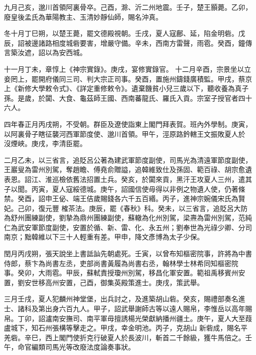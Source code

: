 \begin{pinyinscope}
 九月己亥，邈川首領阿裏骨卒。己酉，滁、沂二州地震。壬子，楚王顥薨。乙卯，廢皇後孟氏為華陽教主、玉清妙靜仙師，賜名沖真。



 冬十月丁巳朔，以楚王薨，罷文德殿視朝。壬戌，夏人寇鄜、延，陷金明砦。戊辰，詔被邊諸路相度城砦要害，增嚴守備。辛未，西南方雷聲，雨雹。癸酉，鐘傳言築汝遮，詔以為安西城。



 十一月丁未，章惇上《神宗實錄》。庚戌，宴修實錄官。
 十二月辛酉，宗景坐以立妾罔上，罷開府儀同三司、判大宗正司事。癸酉，置施州鑄錢廣積監。甲戌，蔡京上《新修大學敕令式》、《詳定重修敕令》。遺棄饑貧小兒三歲以下，聽收養為真子孫。是歲，於闐、大食、龜茲師王國、西南蕃龍氏、羅氏入貢。宗室子授官者四十六人。



 四年春正月丙戌朔，不受朝。群臣及遼使詣東上閣門拜表賀。班內外學制。庚寅，以阿裏骨子瞎征襲河西軍節度使、邈川首領。甲午，涇原路鈐轄王文振敗夏人於
 沒煙峽。庚戌，李清臣罷。



 二月乙未，以三省言，追貶呂公著為建武軍節度副使，司馬光為清遠軍節度副使，王巖叟為雷州別駕，奪趙瞻、傅堯俞贈謚，追韓維致仕及孫固、範百祿、胡宗愈遺表恩。詔江、淮巡檢依舊法招置土兵。癸亥，於闐來貢，黑汗王攻夏人三州，遣其子以聞。丙寅，夏人寇綏德城。庚午，詔國信使毋得以非例之物遺人使，仍著條禁。癸酉，詔申王佖、端王佶歲賜錢各六千五百緡。丙子，進神宗婉儀宋氏為賢妃。己卯，復元豐
 榷茶法。庚辰，罷《春秋》科。癸未，以三省言，追貶呂大防為舒州團練副使，劉摯為鼎州團練副使，蘇轍為化州別駕，梁燾為雷州別駕，范純仁為武安軍節度副使，安置於循、新、雷、化、永五州；劉奉世為光祿少卿、分司南京；黜韓維以下三十人輕重有差。甲申，降文彥博為太子少保。



 閏月丙戌朔，張天說坐上書詆訕先朝處死。壬寅，以曾布知樞密院事，許將為中書侍郎，蔡卞為尚書左丞，吏部尚書黃履為尚書右丞，翰林學士林希同知樞密院
 事。癸卯，大雨雹。甲辰，蘇軾責授瓊州別駕，移昌化軍安置。範祖禹移賓州安置，劉安世移高州安置，己酉，御集英殿策進士。庚戌，策武舉。



 三月壬戌，夏人犯麟州神堂堡，出兵討之，及進築胡山砦。癸亥，賜禮部奏名進士、諸科及第出身六百九人。甲子，詔武舉謝師古等以遠人賜帛，李惟岳以高年賜帛。丁卯，詔瀘南安撫司、南平軍毋擅誘楊光榮獻納播州疆土。庚午，夏人大至葭盧城下，知石州張構等擊走之。甲戌，幸金明池。丙子，克胡山
 新砦成，賜名平羌砦。辛巳，西上閣門使折克行破夏人於長波川，斬首二千餘級，獲牛馬倍之。壬午，命官編類司馬光等改廢法度論奏事狀。




\end{pinyinscope}
